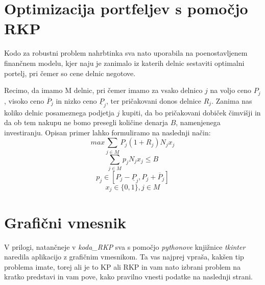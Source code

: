 \documentclass[a4paper,12pt]{article}
\theoremstyle{definition}
\begin{document}
\section{Optimizacija portfeljev s pomočjo RKP}
Kodo za robustni problem nahrbtinka sva nato uporabila na poenostavljenem finančnem modelu,
kjer naju je zanimalo iz katerih delnic sestaviti optimalni portelj, pri čemer so cene delnic
negotove. 
\par
Recimo, da imamo M delnic, pri čemer imamo za vsako delnico $j$ na voljo ceno $P_j$, visoko ceno 
$\overline{P}_{j}$ in nizko ceno $\underline{P}_{j}$, ter pričakovani donos delnice $R_j$. Zanima 
nas koliko delnic posameznega podjetja $j$ kupiti, da bo pričakovani dobiček čimvišji in da ob tem nakupu
ne bomo presegli količine denarja $B$, namenjenega investiranju. Opisan primer lahko formuliramo 
na naslednji način:
\begin{equation}
\tag*{}
     max \sum_{j \in M} P_{j}(1 + R_{j})N_{j}x_{j}
\end{equation}
\begin{equation}
\tag*{}
    \sum_{j \in M} p_{j}N_{j}x_{j} \leq B    
\end{equation}
\begin{equation}
\tag*{}
    p_{j} \in [P_{j} - \underline{P}_{j}, P_{j} + \overline{P}_{j}]
\end{equation}
\begin{equation}
\tag*{}
    x_{j} \in \{0,1\}, j \in M
\end{equation}

\section{Grafični vmesnik}

V prilogi, natančneje v \textit{koda\_RKP} sva s pomočjo \textit{pythonove} knjižnice \textit{tkinter}
naredila aplikacijo z grafičnim vmesnikom. Ta vas najprej vpraša, kakšen tip problema imate, torej ali 
je to KP ali RKP in vam nato izbrani problem na kratko predstavi in vam pove, kako pravilno vnesti podatke 
na naslednji strani.
\end{document}
